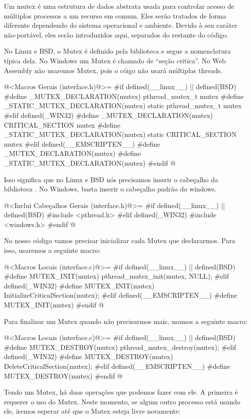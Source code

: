 Um mutex é uma estrutura de dados abstrata usada para controlar acesso
de múltiplos processos a um recurso em comum. Eles serão tratados de
forma diferente dependendo do sistema operacional e ambiente. Devido à
seu caráter não-portável, eles serão introduzidos aqui, separados do
restante do código.

No Linux e BSD, o Mutex é definido pela biblioteca
 e segue a nomenclatura típica dela. No Windows um
Mutex é chamado de ``seção critica''. No Web Assembly não usaremos
Mutex, pois o cóigo não usará múltiplas threads.

\iniciocodigo
@<Macros Gerais (interface.h)@>=
#if defined(__linux__) || defined(BSD)
#define _MUTEX_DECLARATION(mutex) pthread_mutex_t mutex
#define _STATIC_MUTEX_DECLARATION(mutex) static pthread_mutex_t mutex
#elif defined(_WIN32)
#define _MUTEX_DECLARATION(mutex) CRITICAL_SECTION mutex
#define _STATIC_MUTEX_DECLARATION(mutex) static CRITICAL_SECTION mutex
#elif defined(__EMSCRIPTEN__)
#define _MUTEX_DECLARATION(mutex)
#define _STATIC_MUTEX_DECLARATION(mutex)
#endif
@
\fimcodigo

Isso significa que no Linux e BSD nós precisamos inserir o cabeçalho
da biblioteca . No Windows, basta inserir o
cabeçalho padrão do windows.

\iniciocodigo
@<Inclui Cabeçalhos Gerais (interface.h)@>=
#if defined(__linux__) || defined(BSD)
#include <pthread.h>
#elif defined(_WIN32)
#include <windows.h>
#endif
@
\fimcodigo

No nosso código vamos precisar inicializar cada Mutex que
declararmos. Para isso, usaremos a seguinte macro:

\iniciocodigo
@<Macros Locais (interface.c)@>=
#if defined(__linux__) || defined(BSD)
#define MUTEX_INIT(mutex) pthread_mutex_init(mutex, NULL);
#elif defined(_WIN32)
#define MUTEX_INIT(mutex) InitializeCriticalSection(mutex);
#elif defined(__EMSCRIPTEN__)
#define MUTEX_INIT(mutex)
#endif
@
\fimcodigo

Para finalizar um Mutex quando não precisarmos mais, usamos a seguinte
macro:

\iniciocodigo
@<Macros Locais (interface.c)@>=
#if defined(__linux__) || defined(BSD)
#define MUTEX_DESTROY(mutex) pthread_mutex_destroy(mutex);
#elif defined(_WIN32)
#define MUTEX_DESTROY(mutex) DeleteCriticalSection(mutex);
#elif defined(__EMSCRIPTEN__)
#define MUTEX_DESTROY(mutex)
#endif
@
\fimcodigo

Tendo um Mutex, há duas operações que podemos fazer com ele. A
primeira é requerer o uso do Mutex. Neste momento, se algum outro
processo está usando ele, iremos esperar até que o Mutex esteja livre
novamente:

